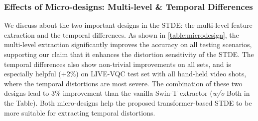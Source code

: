 \documentclass[journal]{IEEEtran}
\begin{document}
\subsubsection{Effects of Micro-designs: Multi-level \& Temporal Differences} We discuss about the two important designs in the STDE: the multi-level feature extraction and the temporal differences. As shown in \cref{table:microdesign}, the multi-level extraction significantly improves the accuracy on all testing scenarios, supporting our claim that it enhances the distortion sensitivity of the STDE. The temporal differences also show non-trivial improvements on all sets, and is especially helpful (+2\%) on LIVE-VQC test set with all hand-held video shots, where the temporal distortions are most severe. The combination of these two designs lead to 3\% improvement than the vanilla Swin-T extractor (\textit{w/o} Both in the Table). Both micro-designs help the proposed transformer-based STDE to be more suitable for extracting temporal distortions.


\begin{table}[]
\caption{Ablation study on multi-level extraction and temporal differences. Both micro-designs further improves the performance of transformer-based STDE.} \label{table:microdesign}
\setlength\tabcolsep{2.4pt}
\renewcommand\arraystretch{1.25}
\footnotesize
\center
{}
\end{table}
\end{document}
